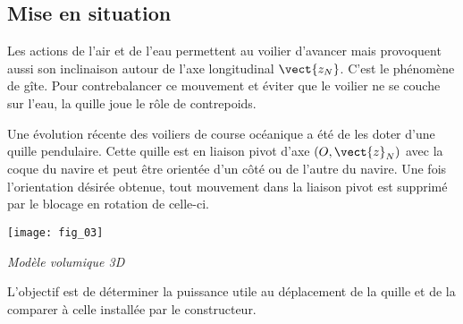 \ifprof
\else
\begin{multicols}{2}
\fi

\section*{Mise en situation}
\ifprof
\else

Les actions de l'air et de l'eau permettent au voilier d'avancer mais provoquent aussi son inclinaison autour de l'axe longitudinal $\vect{z_N}$. C’est le phénomène de gîte. Pour contrebalancer ce mouvement et éviter que le voilier ne se couche sur l’eau, la quille joue le rôle de contrepoids. 



Une évolution récente des voiliers de course océanique a été de les doter d’une quille pendulaire. Cette quille est en liaison pivot d’axe $\left(O,\vect{z}_N \right)$ avec la coque du navire et peut être orientée d’un côté ou de l’autre du navire. Une fois l’orientation désirée obtenue, tout mouvement dans la liaison pivot est supprimé par le blocage en rotation de celle-ci. 

\begin{center}
\texttt{[image: fig\_03]}

\textit{Modèle volumique 3D}
\end{center}




\fi
\begin{obj}
L’objectif est de déterminer la puissance utile au déplacement de la quille et de la comparer à celle installée
par le constructeur.
\end{obj}


\end{multicols}
